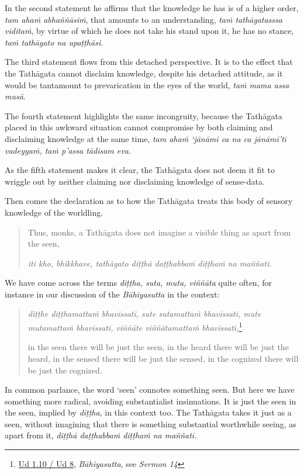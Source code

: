 In the second statement he affirms that the knowledge he has is of a higher order, \emph{tam ahaṁ abhaññāsiṁ}, that amounts to an understanding, \emph{taṁ tathāgatasssa viditaṁ}, by virtue of which he does not take his stand upon it, he has no stance, \emph{taṁ tathāgato na upaṭṭhāsi}.

The third statement flows from this detached perspective. It is to the effect that the Tathāgata cannot disclaim knowledge, despite his detached attitude, as it would be tantamount to prevarication in the eyes of the world, \emph{taṁ mama assa musā}.

The fourth statement highlights the same incongruity, because the Tathāgata placed in this awkward situation cannot compromise by both claiming and disclaiming knowledge at the same time, \emph{tam ahaṁ `jānāmi ca na ca jānāmī'ti vadeyyaṁ, taṁ p'assa tādisam eva.}

As the fifth statement makes it clear, the Tathāgata does not deem it fit to wriggle out by neither claiming nor disclaiming knowledge of sense-data.

Then comes the declaration as to how the Tathāgata treats this body of sensory knowledge of the worldling.

\begin{quote}
Thus, monks, a Tathāgata does not imagine a visible thing as apart from the seen,

\emph{iti kho, bhikkhave, tathāgato diṭṭhā daṭṭhabbaṁ diṭṭhaṁ na maññati.}
\end{quote}

We have come across the terms \emph{diṭṭha, suta, muta, viññāta} quite often, for instance in our discussion of the \emph{Bāhiyasutta} in the context:

\begin{quote}
\emph{diṭṭhe diṭṭhamattaṁ bhavissati, sute sutamattaṁ bhavissati, mute mutamattaṁ bhavissati, viññāte viññātamattaṁ bhavissati,}\footnote{\href{https://suttacentral.net/ud1.10/pli/ms}{Ud 1.10 / Ud 8}, \emph{Bāhiyasutta}, see \emph{Sermon 14}}

in the seen there will be just the seen, in the heard there will be just the heard, in the sensed there will be just the sensed, in the cognized there will be just the cognized.
\end{quote}

In common parlance, the word `seen' connotes something seen. But here we have something more radical, avoiding substantialist insinuations. It is just the seen in the seen, implied by \emph{diṭṭha}, in this context too. The Tathāgata takes it just as a seen, without imagining that there is something substantial worthwhile seeing, as apart from it, \emph{diṭṭhā daṭṭhabbaṁ diṭṭhaṁ na maññati.}

